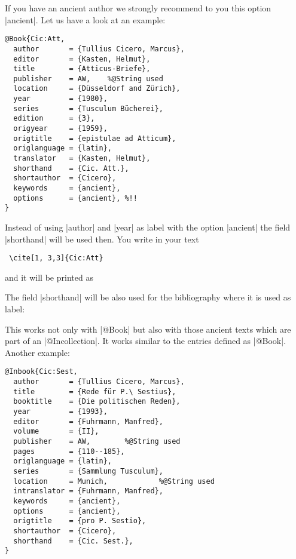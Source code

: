 \documentclass[a4paper,
10pt,
greek,
french,
spanish,
italian,
ngerman,
english
]{ltxdoc}
\begin{document}
 If you have an ancient author we strongly recommend to you this option  |ancient|.
Let us have a look at an example:
\begin{lstlisting}[style=bibentry,label=Cic:Att,caption={{@}Book\{Cic:Att,…\} }]
@Book{Cic:Att,
  author       = {Tullius Cicero, Marcus},
  editor       = {Kasten, Helmut},
  title        = {Atticus-Briefe},
  publisher    = AW, 	%@String used
  location     = {Düsseldorf and Zürich},
  year         = {1980},
  series       = {Tusculum Bücherei},
  edition      = {3},
  origyear     = {1959},
  origtitle    = {epistulae ad Atticum},
  origlanguage = {latin},
  translator   = {Kasten, Helmut},
  shorthand    = {Cic. Att.},
  shortauthor  = {Cicero},
  keywords     = {ancient},
  options      = {ancient}, %!!
}
\end{lstlisting}
Instead of using  |author| and |year| as label with the option |ancient| the field |shorthand| will be used then.
You write in your text
 \begin{lstlisting}
 \cite[1, 3,3]{Cic:Att}\end{lstlisting} 
and it will be printed as
 \begin{refsection}
\begin{bsp}
\cite[1, 3,3]{Cic:Att}
\end{bsp}\end{refsection}
The field |shorthand| will be also used for the bibliography where it is used as label:


This works not only with |@Book| but also with those ancient texts which are part of an |@Incollection|.
It works similar to the entries defined as |@Book|.
Another example:
\begin{lstlisting}[style=bibentry,label=Cic:Sest,caption={{@}Inbook\{Cic:Sest,…\} }]
@Inbook{Cic:Sest,
  author       = {Tullius Cicero, Marcus},
  title        = {Rede für P.\ Sestius},
  booktitle    = {Die politischen Reden},
  year         = {1993},
  editor       = {Fuhrmann, Manfred},
  volume       = {II},
  publisher    = AW,		%@String used
  pages        = {110--185},
  origlanguage = {latin},
  series       = {Sammlung Tusculum},
  location     = Munich,			%@String used
  intranslator = {Fuhrmann, Manfred},
  keywords     = {ancient},
  options      = {ancient},
  origtitle    = {pro P. Sestio},
  shortauthor  = {Cicero},
  shorthand    = {Cic. Sest.},
}
\end{lstlisting}


\end{document}
